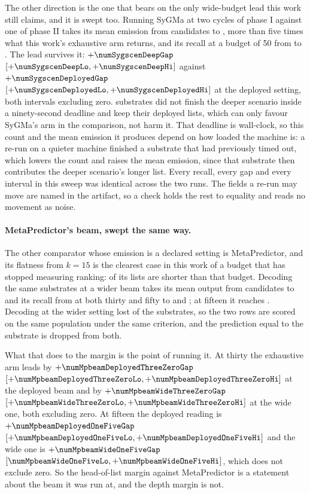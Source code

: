 \documentclass[journal=jcisd8,manuscript=suppinfo,layout=onecolumn]{achemso}
\begin{document}
The other direction is the one that bears on the only wide-budget lead this work still claims, and
it is swept too. Running SyGMa at two cycles of phase I against one of phase II takes its mean
emission from \numSygscenDeployedemitted{} candidates to \numSygscenDeepemitted{}, more than five
times what this work's exhaustive arm returns, and its recall at a budget of 50 from
\numSweepSygmaFiveZero{} to \numSygscenDeeprecall. The lead survives it:
$+\numSygscenDeepGap$ $[+\numSygscenDeepLo, +\numSygscenDeepHi]$ against
$+\numSygscenDeployedGap$ $[+\numSygscenDeployedLo, +\numSygscenDeployedHi]$ at the deployed
setting, both intervals excluding zero. \numSygscenUnfinished{} substrates did not finish the
deeper scenario inside a ninety-second deadline and keep their deployed lists, which can only
favour SyGMa's arm in the comparison, not harm it. That deadline is wall-clock, so this
count and the mean emission it produces depend on how loaded the machine is: a re-run on a quieter
machine finished a substrate that had previously timed out, which lowers the count and raises the
mean emission, since that substrate then contributes the deeper scenario's longer list. Every
recall, every gap and every interval in this sweep was identical across the two runs. The fields a
re-run may move are named in the artifact, so a check holds the rest to equality and
reads no movement as noise.

\paragraph{MetaPredictor's beam, swept the same way.} The other comparator whose emission is a
declared setting is MetaPredictor, and its flatness from $k=15$ is the clearest case in this work of
a budget that has stopped measuring ranking: \numShortMetapredictorOneFive{} of its
\numPopulationN{} lists are shorter than that budget. Decoding the same substrates at a wider beam
takes its mean output from \numMpbeamDeployedemitted{} candidates to \numMpbeamWideemitted{} and
its recall from \numSweepMetapredictorThreeZero{} at both thirty and fifty to
\numMpbeamWiderecallThreeZero{} and \numMpbeamWiderecallFiveZero{}; at fifteen it reaches
\numMpbeamWiderecallOneFive{}. Decoding at the wider setting lost \numMpbeamWidemissingWord{} of the
substrates, so the two rows are scored on the same population under the same criterion, and the
prediction equal to the substrate is dropped from both.

What that does to the margin is the point of running it. At thirty the exhaustive arm leads by
$+\numMpbeamDeployedThreeZeroGap$ $[+\numMpbeamDeployedThreeZeroLo,
+\numMpbeamDeployedThreeZeroHi]$ at the deployed beam and by $+\numMpbeamWideThreeZeroGap$
$[+\numMpbeamWideThreeZeroLo, +\numMpbeamWideThreeZeroHi]$ at the wide one, both excluding zero.
At fifteen the deployed reading is $+\numMpbeamDeployedOneFiveGap$
$[+\numMpbeamDeployedOneFiveLo, +\numMpbeamDeployedOneFiveHi]$ and the wide one is
$+\numMpbeamWideOneFiveGap$ $[\numMpbeamWideOneFiveLo, +\numMpbeamWideOneFiveHi]$, which does not
exclude zero. So the head-of-list margin against MetaPredictor is a statement about the beam it was
run at, and the depth margin is not.
\end{document}
